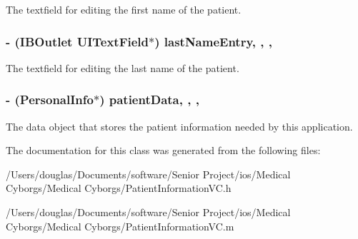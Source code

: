 The textfield for editing the first name of the patient. \hypertarget{interface_patient_information_v_c_a6523689959d35fa22fe3e01838ada93c}{
\subsubsection[{last\-Name\-Entry}]{\setlength{\rightskip}{0pt plus 5cm}-\/ (I\-B\-Outlet U\-I\-Text\-Field$\ast$) last\-Name\-Entry\hspace{0.3cm}{\ttfamily [read]}, {\ttfamily [write]}, {\ttfamily [nonatomic]}, {\ttfamily [retain]}}}\label{interface_patient_information_v_c_a6523689959d35fa22fe3e01838ada93c}
The textfield for editing the last name of the patient. \hypertarget{interface_patient_information_v_c_afef82a462fd797cc833f72f3b33d9b3c}{
\subsubsection[{patient\-Data}]{\setlength{\rightskip}{0pt plus 5cm}-\/ ({\bf Personal\-Info}$\ast$) patient\-Data\hspace{0.3cm}{\ttfamily [read]}, {\ttfamily [write]}, {\ttfamily [atomic]}, {\ttfamily [retain]}}}\label{interface_patient_information_v_c_afef82a462fd797cc833f72f3b33d9b3c}
The data object that stores the patient information needed by this application. 

The documentation for this class was generated from the following files\-:\begin{DoxyCompactItemize}
\item 
/\-Users/douglas/\-Documents/software/\-Senior Project/ios/\-Medical Cyborgs/\-Medical Cyborgs/Patient\-Information\-V\-C.\-h\item 
/\-Users/douglas/\-Documents/software/\-Senior Project/ios/\-Medical Cyborgs/\-Medical Cyborgs/Patient\-Information\-V\-C.\-m\end{DoxyCompactItemize}
